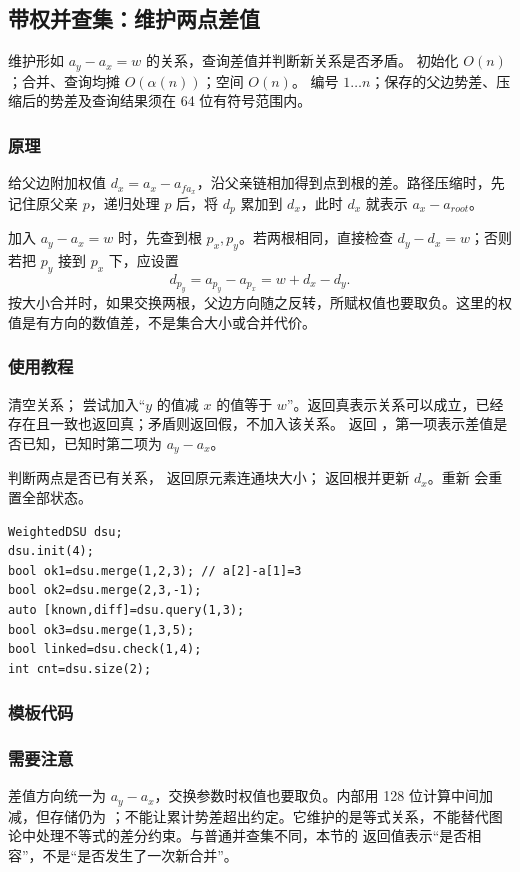 \subsection{带权并查集：维护两点差值}
\label{ds:weighted-dsu}
\AlgorithmInfo
    {维护形如 $a_y-a_x=w$ 的关系，查询差值并判断新关系是否矛盾。}
    {初始化 $O(n)$；合并、查询均摊 $O(\alpha(n))$；空间 $O(n)$。}
    {编号 $1\ldots n$；保存的父边势差、压缩后的势差及查询结果须在 64 位有符号范围内。}
\subsubsection*{原理}
给父边附加权值 $d_x=a_x-a_{fa_x}$，沿父亲链相加得到点到根的差。路径压缩时，先记住原父亲 $p$，递归处理 $p$ 后，将 $d_p$ 累加到 $d_x$，此时 $d_x$ 就表示 $a_x-a_{root}$。

加入 $a_y-a_x=w$ 时，先查到根 $p_x,p_y$。若两根相同，直接检查 $d_y-d_x=w$；否则若把 $p_y$ 接到 $p_x$ 下，应设置
\[
 d_{p_y}=a_{p_y}-a_{p_x}=w+d_x-d_y.
\]
按大小合并时，如果交换两根，父边方向随之反转，所赋权值也要取负。这里的权值是有方向的数值差，不是集合大小或合并代价。

\subsubsection*{使用教程}
 清空关系； 尝试加入“$y$ 的值减 $x$ 的值等于 $w$”。返回真表示关系可以成立，已经存在且一致也返回真；矛盾则返回假，不加入该关系。 返回 ，第一项表示差值是否已知，已知时第二项为 $a_y-a_x$。

 判断两点是否已有关系， 返回原元素连通块大小； 返回根并更新 $d_x$。重新  会重置全部状态。
\begin{lstlisting}[style=mtycpp,numbers=none]
WeightedDSU dsu;
dsu.init(4);
bool ok1=dsu.merge(1,2,3); // a[2]-a[1]=3
bool ok2=dsu.merge(2,3,-1);
auto [known,diff]=dsu.query(1,3);
bool ok3=dsu.merge(1,3,5);
bool linked=dsu.check(1,4);
int cnt=dsu.size(2);
\end{lstlisting}
\subsubsection*{模板代码}
\subsubsection*{需要注意}
差值方向统一为 $a_y-a_x$，交换参数时权值也要取负。内部用 128 位计算中间加减，但存储仍为 ；不能让累计势差超出约定。它维护的是等式关系，不能替代图论中处理不等式的差分约束。与普通并查集不同，本节的  返回值表示“是否相容”，不是“是否发生了一次新合并”。
